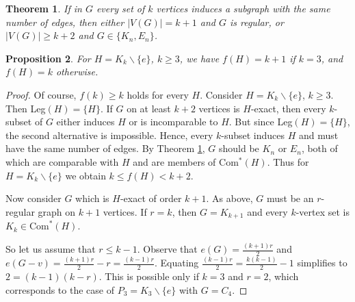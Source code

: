 \documentclass[a4paper,12pt]{article}
\newtheorem{theorem}{Theorem}[section]
\newtheorem{proposition}[theorem]{Proposition}
\begin{document}
\begin{theorem} \label{regular}
If in $G$ every set of $k$ vertices induces a subgraph with the same  number of edges, then either $|V(G)| = k + 1$ and $G$ is regular, or $|V(G)| \geq k + 2$  and $G \in \{K_n,E_n\}$.
\end{theorem}
\begin{proposition}
For $H = K_k \backslash \{e\}$, $k \geq 3$, we have $f(H) = k + 1$ if $k = 3$, and $f(H)=k$ otherwise.
\end{proposition}
\begin{proof}
Of course, $f(k)\geq k$ holds for every $H$.
Consider $H = K_k \backslash \{e\}$, $k \geq 3$. Then Leg$(H) = \{H\}$.  If $G$ on at least $k + 2$  vertices is $H$-exact, then every $k$-subset of $G$ either induces $H$ or  is incomparable to $H$. But since Leg$(H) = \{H\}$, the second alternative is impossible.  Hence, every $k$-subset induces $H$ and must have the same number of edges.  By Theorem \ref{regular}, $G$ should be $K_n$ or $E_n$, both of which are comparable with $H$  and are members of Com$^*(H)$.
Thus for $H = K_k \backslash \{e\}$ we obtain $k \leq f(H) < k+2$.

Now consider $G$  which is $H$-exact of order $k +1$. As above, $G$ must be an $r$-regular graph on $k + 1$ vertices.  If $r = k$, then $G=K_{k+1}$ and every $k$-vertex set is $K_k \in \text{Com}^*(H)$.  

So let us assume that $r \leq k - 1$. Observe that $e(G) = \frac{(k+1)r}{2}$ and $e(G - v) = \frac{(k+1)r}{2}  - r = \frac{(k-1)r}{2}$.  Equating  $\frac{(k-1)r}{2}  = \frac{k(k-1)}{2} -1$ simplifies to   $2 = (k - 1)(k - r)$. This is  possible only if $k = 3$ and $r = 2$, which corresponds to the case of $P_3 = K_3 \backslash \{e\}$ with $G =  C_4$.
\end{proof}
\end{document}
